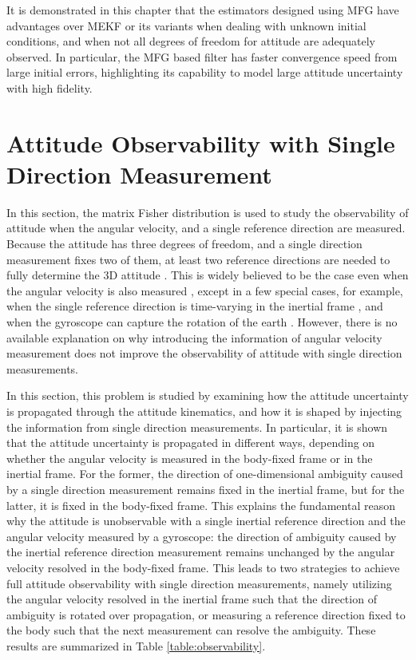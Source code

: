 It is demonstrated in this chapter that the estimators designed using MFG have advantages over MEKF or its variants when dealing with unknown initial conditions, and when not all degrees of freedom for attitude are adequately observed.
In particular, the MFG based filter has faster convergence speed from large initial errors, highlighting its capability to model large attitude uncertainty with high fidelity.

\section{Attitude Observability with Single Direction Measurement} \label{section:observability}

In this section, the matrix Fisher distribution is used to study the observability of attitude when the angular velocity, and a single reference direction are measured.
Because the attitude has three degrees of freedom, and a single direction measurement fixes two of them, at least two reference directions are needed to fully determine the 3D attitude \cite{markley1988attitude,shuster1981three}.
This is widely believed to be the case even when the angular velocity is also measured \cite{mahony2008nonlinear}, except in a few special cases, for example, when the single reference direction is time-varying in the inertial frame \cite{batista2012ges,grip2011attitude,lee2007global}, and when the gyroscope can capture the rotation of the earth \cite{reis2018nonlinear}.
However, there is no available explanation on why introducing the information of angular velocity measurement does not improve the observability of attitude with single direction measurements.

In this section, this problem is studied by examining how the attitude uncertainty is propagated through the attitude kinematics, and how it is shaped by injecting the information from single direction measurements.
In particular, it is shown that the attitude uncertainty is propagated in different ways, depending on whether the angular velocity is measured in the body-fixed frame or in the inertial frame.
For the former, the direction of one-dimensional ambiguity caused by a single direction measurement remains fixed in the inertial frame, but for the latter, it is fixed in the body-fixed frame.
This explains the fundamental reason why the attitude is unobservable with a single inertial reference direction and the angular velocity measured by a gyroscope: the direction of ambiguity caused by the inertial reference direction measurement remains unchanged by the angular velocity resolved in the body-fixed frame.
This leads to two strategies to achieve full attitude observability with single direction measurements, namely utilizing the angular velocity resolved in the inertial frame such that the direction of ambiguity is rotated over propagation, or measuring a reference direction fixed to the body such that the next measurement can resolve the ambiguity.
These results are summarized in Table \ref{table:observability}.

